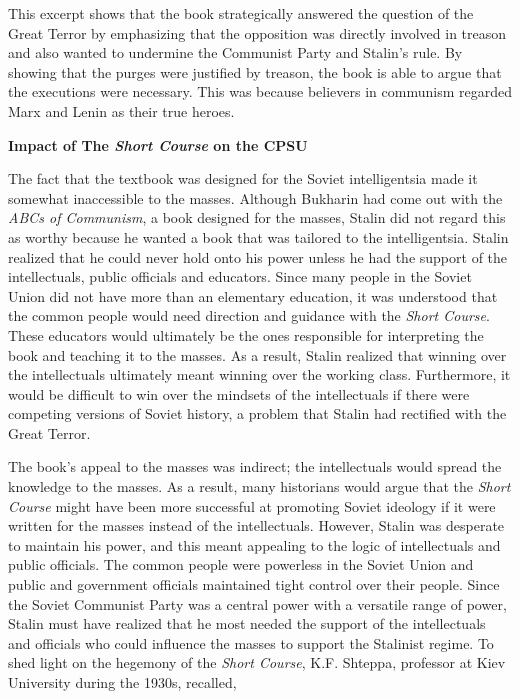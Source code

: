 \documentclass[a4paper, twocolumn]{article}
\begin{document}
This excerpt shows that the book strategically answered the question of
the Great Terror by emphasizing that the opposition was directly
involved in treason and also wanted to undermine the Communist Party
and Stalin's rule. By showing that the purges were justified by
treason, the book is able to argue that the executions were necessary.
This was because believers in communism regarded Marx and Lenin as their true heroes.


\begin{center}\textbf{Impact of The \emph{Short Course} on the CPSU}\end{center}

The fact that the textbook was designed for the Soviet
intelligentsia made it somewhat inaccessible to the
masses. Although Bukharin had come out with the \emph{ABCs of Communism},
a book designed for the masses, Stalin did not regard this as
worthy  because he wanted a book that was tailored to the
intelligentsia. Stalin realized that he could never hold onto his
power unless he had the support of the intellectuals, public
officials and educators. Since many people in the Soviet Union did
not have more than an elementary education, it was understood that
the common people would need direction and guidance with the \emph{Short
  Course}. These educators would ultimately be the ones responsible
for interpreting the book and teaching it to the masses. As a
result, Stalin realized that winning over the intellectuals
ultimately meant winning over the working class.  Furthermore, it would be
difficult to win over the mindsets of the intellectuals if there
were competing versions of Soviet history, a problem that Stalin had
rectified with the Great Terror.

The book's appeal to the masses was indirect; the intellectuals would spread the knowledge to the
masses.  As a result, many historians would argue that the \emph{Short
Course} might have been more successful at promoting Soviet ideology if
it were written for the masses instead of the intellectuals. However,
Stalin was desperate to maintain his power, and this meant appealing
to the logic of intellectuals and public officials. The common people
were powerless in the Soviet Union and public and government officials
maintained tight control over their people. Since the Soviet Communist Party was a
central power with a versatile range of power, Stalin must have
realized that he most needed the support of the intellectuals and
officials who could influence the masses to support the Stalinist
regime. To shed light on the hegemony of the \emph{Short Course},
K.F. Shteppa, professor at Kiev University during the 1930s, recalled,
\end{document}
